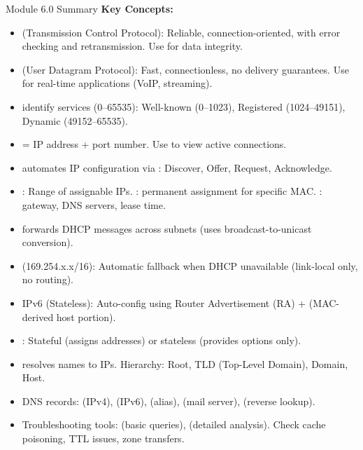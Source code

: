 \documentclass[aspectratio=169]{beamer}  %
\begin{document}
\begin{frame}[t,allowframebreaks]{Module 6.0 Summary}
    \small
    \textbf{Key Concepts:}
    \begin{itemize}
        \item {} (Transmission Control Protocol): Reliable, connection-oriented, with error checking and retransmission. Use for data integrity.
        \item {} (User Datagram Protocol): Fast, connectionless, no delivery guarantees. Use for real-time applications (VoIP, streaming).
        \item {} identify services (0--65535): Well-known (0--1023), Registered (1024--49151), Dynamic (49152--65535).
        \item {} = IP address + port number. Use  to view active connections.
        \item {} automates IP configuration via : Discover, Offer, Request, Acknowledge.
        \item {}: Range of assignable IPs. : permanent assignment for specific MAC. : gateway, DNS servers, lease time.
        \item {} forwards DHCP messages across subnets (uses broadcast-to-unicast conversion).
        \item {} (169.254.x.x/16): Automatic fallback when DHCP unavailable (link-local only, no routing).
        \item IPv6  (Stateless): Auto-config using Router Advertisement (RA) +  (MAC-derived host portion).
        \item {}: Stateful (assigns addresses) or stateless (provides options only).
        \item {} resolves names to IPs. Hierarchy: Root, TLD (Top-Level Domain), Domain, Host.
        \item DNS records:  (IPv4),  (IPv6),  (alias),  (mail server),  (reverse lookup).
        \item Troubleshooting tools:  (basic queries),  (detailed analysis). Check cache poisoning, TTL issues, zone transfers.
    \end{itemize}
\end{frame}

\end{document}
